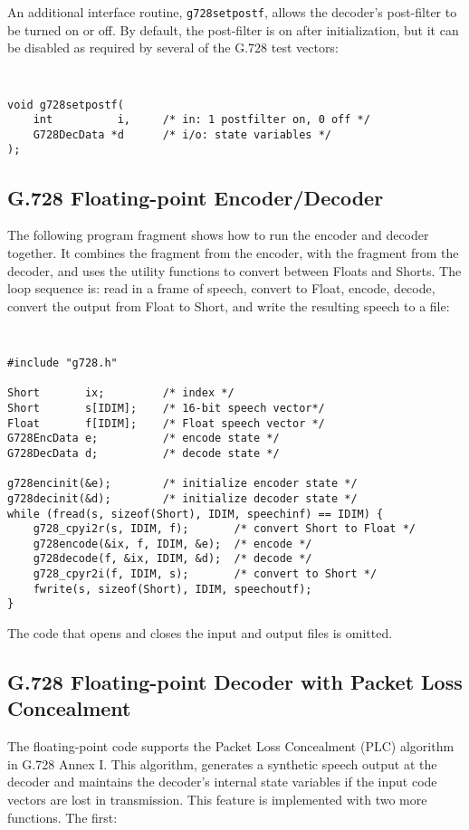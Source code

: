 An additional interface routine, {\tt g728setpostf}, allows the
decoder's post-filter to be turned on or off. By default, the
post-filter is on after initialization, but it can be disabled
as required by several of the G.728 test vectors:

{\tt\small
\begin{verbatim}
void g728setpostf(
    int          i,     /* in: 1 postfilter on, 0 off */
    G728DecData *d      /* i/o: state variables */
);
\end{verbatim}
}

\subsection {G.728 Floating-point Encoder/Decoder}

The following program fragment shows how to run the encoder and
decoder together. It combines the fragment from the encoder, with the fragment
from the decoder, and uses the utility functions to convert between
Floats and Shorts. The loop sequence is: read in a frame of speech, convert
to Float, encode, decode, convert the output from Float to Short, and write
the resulting speech to a file:

{\tt\small
\begin{verbatim}
#include "g728.h"

Short       ix;         /* index */
Short       s[IDIM];    /* 16-bit speech vector*/
Float       f[IDIM];    /* Float speech vector */
G728EncData e;          /* encode state */
G728DecData d;          /* decode state */

g728encinit(&e);        /* initialize encoder state */
g728decinit(&d);        /* initialize decoder state */
while (fread(s, sizeof(Short), IDIM, speechinf) == IDIM) {
    g728_cpyi2r(s, IDIM, f);       /* convert Short to Float */
    g728encode(&ix, f, IDIM, &e);  /* encode */
    g728decode(f, &ix, IDIM, &d);  /* decode */
    g728_cpyr2i(f, IDIM, s);       /* convert to Short */
    fwrite(s, sizeof(Short), IDIM, speechoutf);
}
\end{verbatim}
}

The code that opens and closes the input and output files is omitted.

\subsection {G.728 Floating-point Decoder with Packet Loss Concealment}

The floating-point code supports the Packet Loss Concealment (PLC) algorithm
in G.728 Annex I. This algorithm, generates a synthetic
speech output at the decoder and maintains the decoder's internal
state variables if the input code vectors are lost in transmission.
This feature is implemented with two more functions. The first:

